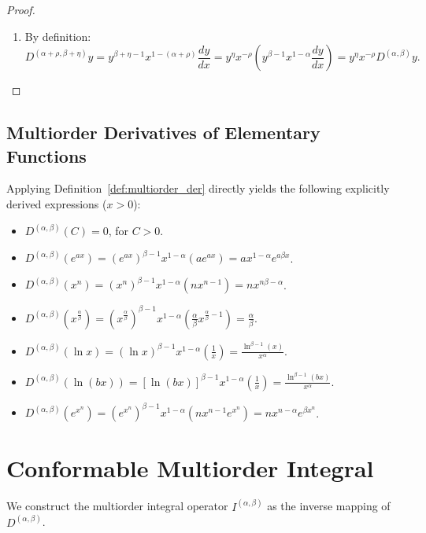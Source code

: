 \documentclass[oneside,10pt]{article}
\theoremstyle{plain}
\theoremstyle{definition}
\begin{document}
\begin{proof}
\begin{enumerate}
    \item[5.] By definition:
    \[
    D^{(\alpha+\rho, \beta+\eta)} y = y^{\beta+\eta-1} x^{1-(\alpha+\rho)} \frac{dy}{dx} = y^\eta x^{-\rho} \left( y^{\beta-1} x^{1-\alpha} \frac{dy}{dx} \right) = y^\eta x^{-\rho} D^{(\alpha,\beta)} y.
    \]
\end{enumerate}
\end{proof}

\subsection{Multiorder Derivatives of Elementary Functions}

Applying Definition~\ref{def:multiorder_der} directly yields the following explicitly derived expressions ($x > 0$):
\begin{itemize}
    \item $D^{(\alpha,\beta)}(C) = 0$, for $C > 0$.
    \item $D^{(\alpha,\beta)}(e^{ax}) = (e^{ax})^{\beta-1} x^{1-\alpha} (a e^{ax}) = a x^{1-\alpha} e^{a\beta x}$.
    \item $D^{(\alpha,\beta)}(x^n) = (x^n)^{\beta-1} x^{1-\alpha} (n x^{n-1}) = n x^{n\beta - \alpha}$.
    \item $D^{(\alpha,\beta)}\left(x^{\frac{\alpha}{\beta}}\right) = \left(x^{\frac{\alpha}{\beta}}\right)^{\beta-1} x^{1-\alpha} \left( \frac{\alpha}{\beta} x^{\frac{\alpha}{\beta}-1} \right) = \frac{\alpha}{\beta}$.
    \item $D^{(\alpha,\beta)}(\ln x) = (\ln x)^{\beta-1} x^{1-\alpha} \left( \frac{1}{x} \right) = \frac{\ln^{\beta-1}(x)}{x^\alpha}$.
    \item $D^{(\alpha,\beta)}(\ln(bx)) = [\ln(bx)]^{\beta-1} x^{1-\alpha} \left(\frac{1}{x}\right) = \frac{\ln^{\beta-1}(bx)}{x^\alpha}$.
    \item $D^{(\alpha,\beta)}(e^{x^n}) = (e^{x^n})^{\beta-1} x^{1-\alpha} (n x^{n-1} e^{x^n}) = n x^{n-\alpha} e^{\beta x^n}$.
\end{itemize}

\section{Conformable Multiorder Integral}\label{sec:multi_int}

We construct the multiorder integral operator $I^{(\alpha,\beta)}$ as the inverse mapping of $D^{(\alpha,\beta)}$.
\end{document}
